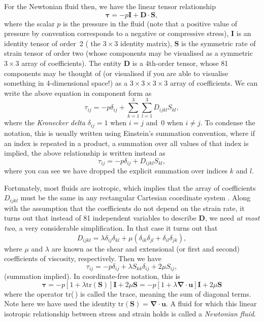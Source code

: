 \documentclass[a4paper,11pt]		{report}
\begin{document}
For the Newtonian fluid then, we have the linear tensor relationship
\begin{equation}
\bm{\tau}=-p\bm{I} + \bm{D\cdot S},
\end{equation}
where the scalar $p$ is the pressure in the fluid (note that a
positive value of pressure by convention corresponds to a negative or
compressive stress), $\bm{I}$ is an identity tensor of order~2 (\ie
the $3\times3$ identity matrix), $\bm{S}$ is the symmetric rate of
strain tensor of order two (whose components may be visualised as a
symmetric $3\times3$ array of coefficients). The entity $\bm{D}$ is a
4th-order tensor, whose 81 components may be thought of (or visualised
if you are able to visualise something in 4-dimensional space!) as a
$3\times3\times3\times3$ array of coefficients. We can write the above
equation in component form as
\begin{equation}
\tau_{ij} = -p \delta_{ij} + \sum_{k=1}^3\sum_{l=1}^3 D_{ijkl}S_{kl},
\end{equation}
where the \emph{Kronecker delta} $\delta_{ij}=1$ when $i=j$ and~0 when
$i\ne j$. To condense the notation, this is usually written using
Einstein's summation convention, where if an index is repeated in a
product, a summation over all values of that index is implied, \ie the
above relationship is written instead as
\begin{equation}
\tau_{ij} = -p \delta_{ij} + D_{ijkl}S_{kl},
\end{equation}
where you can see we have dropped the explicit summation over indices
$k$ and $l$.

Fortunately, most fluids are isotropic, which implies that the array
of coefficients $D_{ijkl}$ must be the same in any rectangular
Cartesian coordinate system \citep[see e.g.][ch.~8]{fung69}. Along
with the assumption that the coefficients do not depend on the strain
rate, it turns out that instead of 81 independent variables to
describe $\bm{D}$, we need \emph{at most two}, a very considerable
simplification. In that case it turns out that 
\begin{equation}
D_{ijkl} = \lambda \delta_{ij}\delta_{kl} +
 \mu\left(\delta_{ik}\delta_{jl} + \delta_{il}\delta_{jk}\right),
\end{equation}
where $\mu$ and $\lambda$ are known as the shear and extensional (or
first and second) coefficients of viscosity, respectively. Then we
have
\begin{equation}
\tau_{ij} = -p \delta_{ij} + \lambda S_{kk}\delta_{ij} + 2\mu S_{ij},
\end{equation}
(summation implied). In coordinate-free notation, this is
\begin{equation}
\bm{\tau} =
-p\left[1 + \lambda \mathrm{tr}(\bm{S})\right]\bm{I} + 2\mu\bm{S}=
-p\left[1 + \lambda \bm{\nabla\cdot u}\right]\bm{I} + 2\mu\bm{S}
\end{equation}
where the operator tr(\,) is called the trace, meaning the sum of
diagonal terms. Note here we have used the identity
$\mathrm{tr}(\bm{S})=\bm{\nabla\cdot u}$. A fluid for which this
linear isotropic relationship between stress and strain holds is called
a \emph{Newtonian fluid}. 
\end{document}

